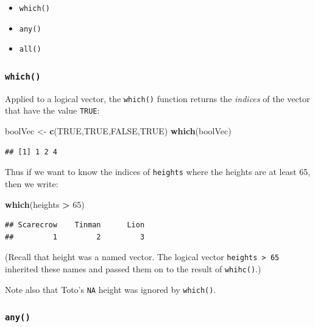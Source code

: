 \documentclass[]{book}
\makeatletter
\newenvironment{Shaded}{\begin{snugshade}}{\end{snugshade}}
\newcommand{\KeywordTok}[1]{\textcolor[rgb]{0.13,0.29,0.53}{\textbf{#1}}}
\newcommand{\DecValTok}[1]{\textcolor[rgb]{0.00,0.00,0.81}{#1}}
\newcommand{\StringTok}[1]{\textcolor[rgb]{0.31,0.60,0.02}{#1}}
\newcommand{\OtherTok}[1]{\textcolor[rgb]{0.56,0.35,0.01}{#1}}
\newcommand{\OperatorTok}[1]{\textcolor[rgb]{0.81,0.36,0.00}{\textbf{#1}}}
\newcommand{\NormalTok}[1]{#1}
\providecommand{\tightlist}{%
  \setlength{\itemsep}{0pt}\setlength{\parskip}{0pt}}
\newenvironment{kframe}{%
\medskip{}
\setlength{\fboxsep}{.8em}
 \def\at@end@of@kframe{}%
 \ifinner\ifhmode%
  \def\at@end@of@kframe{\end{minipage}}%
  \begin{minipage}{\columnwidth}%
 \fi\fi%
 \def\FrameCommand##1{\hskip\@totalleftmargin \hskip-\fboxsep
 \colorbox{shadecolor}{##1}\hskip-\fboxsep
     \hskip-\linewidth \hskip-\@totalleftmargin \hskip\columnwidth}%
 \MakeFramed {\advance\hsize-\width
   \@totalleftmargin\z@ \linewidth\hsize
   \@setminipage}}%
 {\par\unskip\endMakeFramed%
 \at@end@of@kframe}
\renewenvironment{Shaded}{\begin{kframe}}{\end{kframe}}
\theoremstyle{definition}
\theoremstyle{definition}
\theoremstyle{definition}
\theoremstyle{remark}
\makeatother
\begin{document}
\begin{itemize}
\tightlist
\item
  \texttt{which()}
\item
  \texttt{any()}
\item
  \texttt{all()}
\end{itemize}

\subsubsection{\texorpdfstring{\texttt{which()}
}{which() }}\label{which}

Applied to a logical vector, the \texttt{which()} function returns the
\emph{indices} of the vector that have the value \texttt{TRUE}:

\begin{Shaded}
\begin{Highlighting}[]
\NormalTok{boolVec <-}\StringTok{ }\KeywordTok{c}\NormalTok{(}\OtherTok{TRUE}\NormalTok{,}\OtherTok{TRUE}\NormalTok{,}\OtherTok{FALSE}\NormalTok{,}\OtherTok{TRUE}\NormalTok{)}
\KeywordTok{which}\NormalTok{(boolVec)}
\end{Highlighting}
\end{Shaded}

\begin{verbatim}
## [1] 1 2 4
\end{verbatim}

Thus if we want to know the indices of \texttt{heights} where the
heights are at least 65, then we write:

\begin{Shaded}
\begin{Highlighting}[]
\KeywordTok{which}\NormalTok{(heights }\OperatorTok{>}\StringTok{ }\DecValTok{65}\NormalTok{)}
\end{Highlighting}
\end{Shaded}

\begin{verbatim}
## Scarecrow    Tinman      Lion 
##         1         2         3
\end{verbatim}

(Recall that height was a named vector. The logical vector
\texttt{heights\ \textgreater{}\ 65} inherited these names and passed
them on to the result of \texttt{whihc()}.)

Note also that Toto's \texttt{NA} height was ignored by
\texttt{which()}.

\subsubsection{\texorpdfstring{\texttt{any()}}{any()}}\label{any}
\end{document}
